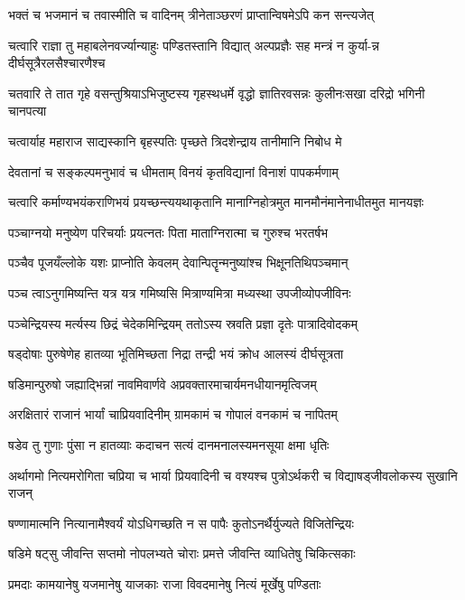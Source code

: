 \twolineshloka
{भक्तं च भजमानं च तवास्मीति च वादिनम्}
{त्रीनेताञ्छरणं प्राप्तान्विषमेऽपि कन सन्त्यजेत्}


\twolineshloka
{चत्वारि राज्ञा तु महाबलेनवर्ज्यान्याहुः पण्डितस्तानि विद्यात्}
{अल्पप्रज्ञैः सह मन्त्रं न कुर्या-न्न दीर्घसूत्रैरलसैश्चारणैश्च}


\twolineshloka
{चतवारि ते तात गृहे वसन्तुश्रियाऽभिजुष्टस्य गृहस्थधर्मे}
{वृद्धो ज्ञातिरवसन्नः कुलीनःसखा दरिद्रो भगिनी चानपत्या}


\twolineshloka
{चत्वार्याह महाराज साद्यस्कानि बृहस्पतिः}
{पृच्छते त्रिदशेन्द्राय तानीमानि निबोध मे}


\twolineshloka
{देवतानां च सङ्कल्पमनुभावं च धीमताम्}
{विनयं कृतविद्यानां विनाशं पापकर्मणाम्}


\twolineshloka
{चत्वारि कर्माण्यभयंकराणिभयं प्रयच्छन्त्ययथाकृतानि}
{मानाग्निहोत्रमुत मानमौनंमानेनाधीतमुत मानयज्ञः}


\twolineshloka
{पञ्चाग्नयो मनुष्येण परिचर्याः प्रयत्नतः}
{पिता माताग्निरात्मा च गुरुश्च भरतर्षभ}


\twolineshloka
{पञ्चैव पूजयँल्लोके यशः प्राप्नोति केवलम्}
{देवान्पितॄन्मनुष्यांश्च भिक्षूनतिथिपञ्चमान्}


\threelineshloka
{पञ्च त्वाऽनुगमिष्यन्ति यत्र यत्र गमिष्यसि}
{मित्राण्यमित्रा मध्यस्था उपजीव्योपजीविनः}
{}


\twolineshloka
{पञ्चेन्द्रियस्य मर्त्यस्य छिद्रं चेदेकमिन्द्रियम्}
{ततोऽस्य स्रवति प्रज्ञा दृतेः पात्रादिवोदकम्}


\threelineshloka
{षड्दोषाः पुरुषेणेह हातव्या भूतिमिच्छता}
{निद्रा तन्द्री भयं क्रोध आलस्यं दीर्घसूत्रता}
{}


\twolineshloka
{षडिमान्पुरुषो जह्याद्भिन्नां नावमिवार्णवे}
{अप्रवक्तारमाचार्यमनधीयानमृत्विजम्}


\twolineshloka
{अरक्षितारं राजानं भार्यां चाप्रियवादिनीम्}
{ग्रामकामं च गोपालं वनकामं च नापितम्}


\twolineshloka
{षडेव तु गुणाः पुंसा न हातव्याः कदाचन}
{सत्यं दानमनालस्यमनसूया क्षमा धृतिः}


\twolineshloka
{अर्थागमो नित्यमरोगिता चप्रिया च भार्या प्रियवादिनी च}
{वश्यश्च पुत्रोऽर्थकरी च विद्याषड्जीवलोकस्य सुखानि राजन्}


\twolineshloka
{षण्णामात्मनि नित्यानामैश्वर्यं योऽधिगच्छति}
{न स पापैः कुतोऽनर्थैर्युज्यते विजितेन्द्रियः}


\twolineshloka
{षडिमे षट्सु जीवन्ति सप्तमो नोपलभ्यते}
{चोराः प्रमत्ते जीवन्ति व्याधितेषु चिकित्सकाः}


\twolineshloka
{प्रमदाः कामयानेषु यजमानेषु याजकाः}
{राजा विवदमानेषु नित्यं मूर्खेषु पण्डिताः}


